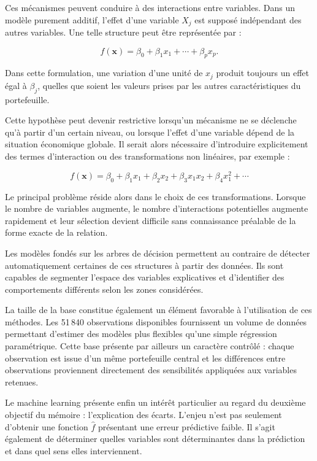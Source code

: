 Ces mécanismes peuvent conduire à des interactions entre variables. Dans un modèle purement additif, l'effet d'une variable $X_j$ est supposé indépendant des autres variables. Une telle structure peut être représentée par :

\begin{equation}
    f(\mathbf{x})
    =
    \beta_0
    +
    \beta_1 x_1
    +
    \cdots
    +
    \beta_p x_p.
\end{equation}

Dans cette formulation, une variation d'une unité de $x_j$ produit toujours un effet égal à $\beta_j$, quelles que soient les valeurs prises par les autres caractéristiques du portefeuille.

Cette hypothèse peut devenir restrictive lorsqu'un mécanisme ne se déclenche qu'à partir d'un certain niveau, ou lorsque l'effet d'une variable dépend de la situation économique globale. Il serait alors nécessaire d'introduire explicitement des termes d'interaction ou des transformations non linéaires, par exemple :

\begin{equation}
    f(\mathbf{x})
    =
    \beta_0
    +
    \beta_1 x_1
    +
    \beta_2 x_2
    +
    \beta_3 x_1 x_2
    +
    \beta_4 x_1^2
    + \cdots
\end{equation}

Le principal problème réside alors dans le choix de ces transformations. Lorsque le nombre de variables augmente, le nombre d'interactions potentielles augmente rapidement et leur sélection devient difficile sans connaissance préalable de la forme exacte de la relation.

Les modèles fondés sur les arbres de décision permettent au contraire de détecter automatiquement certaines de ces structures à partir des données. Ils sont capables de segmenter l'espace des variables explicatives et d'identifier des comportements différents selon les zones considérées.

La taille de la base constitue également un élément favorable à l'utilisation de ces méthodes. Les 51\,840 observations disponibles fournissent un volume de données permettant d'estimer des modèles plus flexibles qu'une simple régression paramétrique. Cette base présente par ailleurs un caractère contrôlé : chaque observation est issue d'un même portefeuille central et les différences entre observations proviennent directement des sensibilités appliquées aux variables retenues.

Le machine learning présente enfin un intérêt particulier au regard du deuxième objectif du mémoire : l'explication des écarts. L'enjeu n'est pas seulement d'obtenir une fonction $\widehat{f}$ présentant une erreur prédictive faible. Il s'agit également de déterminer quelles variables sont déterminantes dans la prédiction et dans quel sens elles interviennent.


